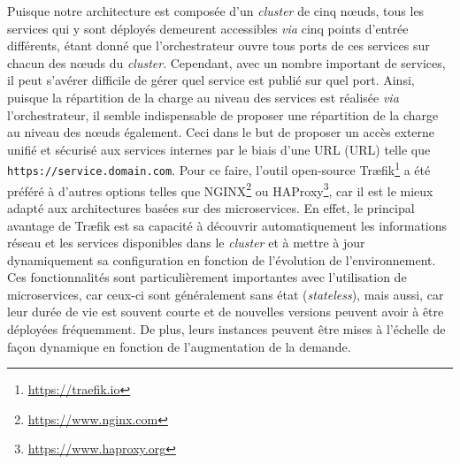Puisque notre architecture est composée d'un \textit{cluster} de cinq n\oe{}uds, tous les services qui y sont déployés demeurent accessibles \textit{via} cinq points d'entrée différents, étant donné que l'orchestrateur ouvre tous ports de ces services sur chacun des n\oe{}uds du \textit{cluster}. Cependant, avec un nombre important de services, il peut s'avérer difficile de gérer quel service est publié sur quel port. Ainsi, puisque la répartition de la charge au niveau des services est réalisée \textit{via} l'orchestrateur, il semble indispensable de proposer une répartition de la charge au niveau des n\oe{}uds également. Ceci dans le but de proposer un accès externe unifié et sécurisé aux services internes par le biais d'une \acs{URL} (\acl{URL}) telle que \texttt{https://service.domain.com}. Pour ce faire, l'outil open-source Tr\ae{}fik\footnote{\url{https://traefik.io}} a été préféré à d'autres options telles que NGINX\footnote{\url{https://www.nginx.com}} ou HAProxy\footnote{\url{https://www.haproxy.org}}, car il est le mieux adapté aux architectures basées sur des microservices. En effet, le principal avantage de Tr\ae{}fik est sa capacité à découvrir automatiquement les informations réseau et les services disponibles dans le \textit{cluster} et à mettre à jour dynamiquement sa configuration en fonction de l'évolution de l'environnement. Ces fonctionnalités sont particulièrement importantes avec l'utilisation de  microservices, car ceux-ci sont généralement sans état (\textit{stateless}), mais aussi, car leur durée de vie est souvent courte et de nouvelles versions peuvent avoir à être déployées fréquemment. De plus, leurs instances peuvent être mises à l'échelle de façon dynamique en fonction de l'augmentation de la demande.

